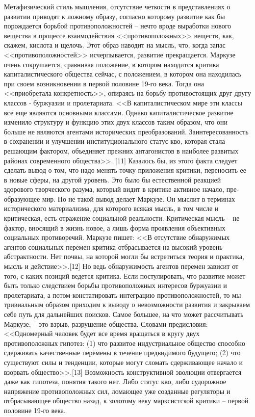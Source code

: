 \documentclass{book}
\begin{document}
{Метафизический стиль мышления, отсутствие четкости в представлениях о развитии приводят к ложному образу, со­гласно которому развитие как бы порождается борьбой про­тивоположностей -- нечто вроде выработки нового вещества в процессе взаимодействия <<противоположных>> веществ, как, скажем, кислота и щелочь. Этот образ наводит на мысль, что, когда запас <<противоположностей>> исчерпывается, развитие прекращается. Маркузе очень сокрушается, сравнивая поло­жение, в котором находится критика капиталистического об­щества сейчас, с положением, в котором она находилась при своем возникновении в первой половине 19‑го века. Тогда она <<приобретала конкретность>>, опираясь на борьбу противо­стоящих друг другу классов ‑ буржуазии и пролетариата. <<В капиталистическом мире эти классы все еще являются основ­ными классами. Однако капиталистическое развитие измени­ло структуру и функцию этих двух классов таким образом, что они больше не являются агентами исторических преобра­зований. Заинтересованность в сохранении и улучшении инсти­туционального статус кво, которая стала решающим фактором, объединяет прежних антагонистов в наиболее развитых рай­онах современного общества>>. [11] Казалось бы, из этого фак­та следует сделать вывод о том, что надо менять точку прило­жения критики, переносить ее в новые сферы, на другой уро­вень. Это было бы естественной реакцией здорового творче­ского разума, который видит в критике активное начало, пре­образующее мир. Но не такой вывод делает Маркузе. Он мыслит в терминах исторического материализма, для которого всякая мысль, в том числе и критическая, есть отражение социальной реальности. Критическая мысль -- не фактор, вносящий в жизнь новое, а лишь форма проявления объективных социальных противоречий. Маркузе пишет: <<В отсутствие обнаружимых агентов социальных перемен критика отбрасывается на высо­кий уровень абстрактности. Нет почвы, на которой могли бы встретиться теория и практика, мысль и действие>>.[12] Но ведь обнаружимость агентов перемен зависит от того, с каких пози­ций ведется критика. Если постулировать, что развитие может быть только следствием борьбы противоположных интересов буржуазии и пролетариата, а потом констатировать интегра­цию противоположностей, то мы тривиальным образом при­ходим к выводу о невозможности развития и закрываем себе путь для дальнейших поисков. Самое большее, на что может рассчитывать Маркузе, -- это взрыв, разрушение общества. Словами предисловия: <<Одномерный человек  будет все время вращаться в кругу двух противоположных гипотез: (1) что развитое индустриальное общество способно сдерживать ка­чественные перемены в течение предвидимого будущего; (2) что существуют силы и тенденции, которые могут сломать сдерживающее начало и взорвать общество>>.[13] Возможность конструктивной эволюции отвергается даже как гипотеза, по­нятия такого нет. Либо статус кво, либо судорожное напряже­ние противоположных сил, ломающее уже созданные регуля­торы и отбрасывающее общество назад, к золотому веку марк­систской критики -- первой половине 19‑го века.

}
\end{document}

